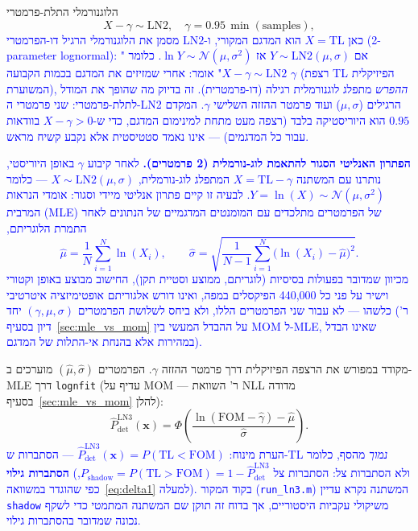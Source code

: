 \documentclass[12pt,a4paper]{article}
\newcommand{\TL}{\mathrm{TL}}
\newcommand{\Pshadow}{P_{\mathrm{shadow}}}
\DeclareRobustCommand{\aiedit}[1]{\textcolor{blue}{#1}}
\begin{document}
הלוגנורמלי התלת-פרמטרי
\begin{equation}
  X - \gamma \sim \mathrm{LN2}, \quad \gamma = 0.95\,\min(\text{samples}),
\end{equation}
\aiedit{כאן $X=\TL$ הוא המדגם המקורי, ו-$\mathrm{LN2}$ מסמן את הלוגנורמלי הרגיל
דו-הפרמטרי (2-parameter lognormal): אם $Y\sim\mathrm{LN2}(\mu,\sigma)$ אז $\ln Y\sim\mathcal{N}(\mu,\sigma^2)$.
כלומר "$X-\gamma\sim\mathrm{LN2}$" אומר: אחרי שמזיזים את המדגם בכמות הקבועה $\gamma$
(רצפת TL הפיזיקלית המשוערת), \emph{ההפרש} מתפלג לוגנורמלית רגילה (דו-פרמטרית).
זה בדיוק מה שהופך את המודל לתלת-פרמטרי: שני פרמטרי ה-LN2 הרגילים ($\mu,\sigma$)
ועוד פרמטר ההזזה השלישי $\gamma$. המקדם $0.95$ הוא היוריסטיקה בלבד (רצפה מעט
מתחת למינימום המדגם, כדי ש-$X-\gamma>0$ בוודאות עבור כל המדגמים) — אינו נאמד
סטטיסטית אלא נקבע קשיח מראש.}

\aiedit{\textbf{הפתרון האנליטי הסגור להתאמת לוג-נורמלית (2 פרמטרים).}
לאחר קיבוע $\gamma$ באופן היוריסטי, נותרנו עם המשתנה $X=\mathrm{TL}-\gamma$
המתפלג לוג-נורמלית, $X\sim\mathrm{LN2}(\mu,\sigma)$ — כלומר $Y=\ln(X)\sim\mathcal{N}(\mu,\sigma^2)$.
לבעיה זו קיים פתרון אנליטי מיידי וסגור: אומדי הנראות המרבית (MLE) של הפרמטרים
מתלכדים עם המומנטים המדגמיים של הנתונים לאחר התמרת הלוגריתם,
\begin{equation}
  \hat\mu = \frac{1}{N}\sum_{i=1}^N \ln(X_i), \qquad
  \hat\sigma = \sqrt{\frac{1}{N-1}\sum_{i=1}^N\bigl(\ln(X_i)-\hat\mu\bigr)^2}.
  \label{eq:ln2_closed_form}
\end{equation}
מכיוון שמדובר בפעולות בסיסיות (לוגריתם, ממוצע וסטיית תקן), החישוב מבוצע באופן
וקטורי וישיר על פני כל 440{,}000 הפיקסלים במפה, ואינו דורש אלגוריתם אופטימיזציה
איטרטיבי כלשהו — לא עבור שני הפרמטרים הללו, ולא ביחס לשלושת הפרמטרים
$(\gamma,\mu,\sigma)$ יחד (ר' דיון בסעיף~\ref{sec:mle_vs_mom} על ההבדל
המעשי בין MOM ל-MLE, שאינו הבדל במהירות אלא בהנחת אי-התלות של המדגם).}

מקודד במפורש את הרצפה הפיזיקלית דרך פרמטר ההזזה $\gamma$.
הפרמטרים $(\hat\mu, \hat\sigma)$ מוערכים ב-\textenglish{MLE} דרך \texttt{lognfit}
(עדיף על \textenglish{MOM} — ר' השוואת \textenglish{NLL} מדודה בסעיף~\ref{sec:mle_vs_mom} להלן):
\begin{equation}
  \hat{P}_{\mathrm{det}}^{\mathrm{LN3}}(\mathbf{x})
  = \Phi\!\left(\frac{\ln(\mathrm{FOM}-\hat\gamma)-\hat\mu}{\hat\sigma}\right).
\end{equation}
\aiedit{הערת מינוח: $\hat{P}_{\mathrm{det}}^{\mathrm{LN3}}(\mathbf{x}) = P(\TL<\mathrm{FOM})$ —
הסתברות ש-TL \emph{נמוך} מהסף, כלומר \textbf{הסתברות גילוי} (ולא הסתברות צל: הסתברות צל
$\Pshadow=P(\TL>\mathrm{FOM})=1-\hat{P}_{\mathrm{det}}^{\mathrm{LN3}}$, כפי שהוגדר
במשוואה~\ref{eq:delta1} למעלה). בקוד המקור (\texttt{run\_ln3.m}) המשתנה נקרא עדיין
\texttt{shadow} משיקולי עקביות היסטוריים, אך בדוח זה תוקן שם המשתנה המתמטי כדי לשקף
נכונה שמדובר בהסתברות גילוי.}
\end{document}
